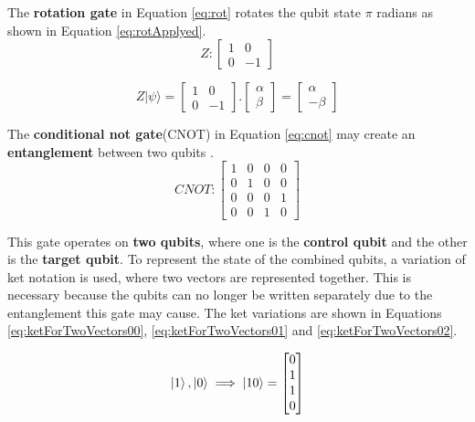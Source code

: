 			\par The \textbf{rotation gate} in Equation \ref{eq:rot} rotates the qubit state $\pi$ radians as shown in Equation \ref{eq:rotApplyed}.
			\begin{equation}
				\label{eq:rot}
				Z : 
				\begin{bmatrix}
					1& 0 \\
					0& -1
				\end{bmatrix}
			\end{equation}
			
			\begin{equation}
				\label{eq:rotApplyed}
				Z|\psi\rangle = \begin{bmatrix}
					1& 0 \\
					0& -1
				\end{bmatrix} . \begin{bmatrix}
					\alpha \\
					\beta
				\end{bmatrix} = \begin{bmatrix}
					\alpha \\
					-\beta
				\end{bmatrix}
			\end{equation}

			\par The \textbf{conditional not gate}(CNOT) in Equation \ref{eq:cnot} may create an \textbf{entanglement} between two qubits \cite{nielsen2002quantum}.
			\begin{equation}
				\label{eq:cnot}
				CNOT : 
				\begin{bmatrix}
					1& 0& 0& 0 \\
					0& 1& 0& 0 \\
					0& 0& 0& 1 \\
					0& 0& 1& 0
				\end{bmatrix}
			\end{equation}
		
			\par This gate operates on \textbf{two qubits}, where one is the \textbf{control qubit} and the other is the \textbf{target qubit}. To represent the state of the combined qubits, a variation of ket notation is used, where two vectors are represented together. This is necessary because the qubits can no longer be written separately due to the entanglement this gate may cause. The ket variations are shown in Equations \ref{eq:ketForTwoVectors00}, \ref{eq:ketForTwoVectors01} and \ref{eq:ketForTwoVectors02}.
			
			\begin{equation}
				\label{eq:ketForTwoVectors00}
				\ket{1}, \ket{0} \implies
				\ket{10} = \begin{bmatrix}
					0 \\
					1 \\
					1 \\
					0
				\end{bmatrix}				
			\end{equation}
		
